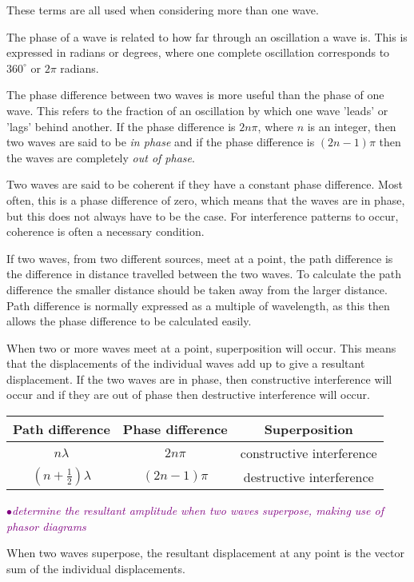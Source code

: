 \documentclass[a4paper,11pt,twoside]{memoir}
\newcounter{spec}[chapter]
\newcommand{\spec}[1]{\Needspace{5\baselineskip}\textcolor{purple}{$\bullet$\hspace{0.5cm}\textit{#1}}}
\begin{document}
These terms are all used when considering more than one wave.

The phase of a wave is related to how far through an oscillation a wave is. This is expressed in radians or degrees, where one complete oscillation corresponds to $360^{\circ}$ or $2\pi$ radians.

The phase difference between two waves is more useful than the phase of one wave. This refers to the fraction of an oscillation by which one wave 'leads' or 'lags' behind another. If the phase difference is $2n\pi$, where $n$ is an integer, then two waves are said to be \emph{in phase} and if the phase difference is $(2n-1)\pi$ then the waves are completely \emph{out of phase}.

Two waves are said to be coherent if they have a constant phase difference. Most often, this is a phase difference of zero, which means that the waves are in phase, but this does not always have to be the case. For interference patterns to occur, coherence is often a necessary condition.

If two waves, from two different sources, meet at a point, the path difference is the difference in distance travelled between the two waves. To calculate the path difference the smaller distance should be taken away from the larger distance. Path difference is normally expressed as a multiple of wavelength, as this then allows the phase difference to be calculated easily.

When two or more waves meet at a point, superposition will occur. This means that the displacements of the individual waves add up to give a resultant displacement. If the two waves are in phase, then constructive interference will occur and if they are out of phase then destructive interference will occur.

\begin{center}
\begin{tabular}{c|c|c}
\textbf{Path difference} & \textbf{Phase difference} & \textbf{Superposition}\\
\hline
$n\lambda$ & $2n\pi$ & constructive interference\\
\hline
$(n+\frac{1}{2})\lambda$ & $(2n-1)\pi$ & destructive interference
\end{tabular}
\end{center}

\spec{determine the resultant amplitude when two waves superpose, making use of phasor diagrams}

When two waves superpose, the resultant displacement at any point is the vector sum of the individual displacements.
\end{document}
